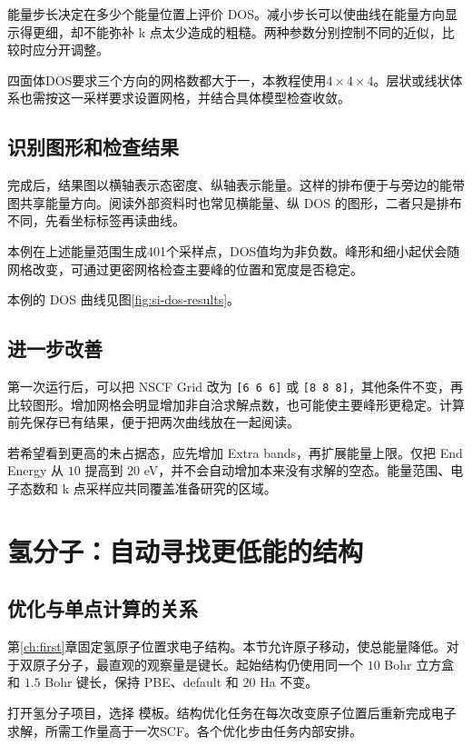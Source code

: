 能量步长决定在多少个能量位置上评价 DOS。减小步长可以使曲线在能量方向显示得更细，却不能弥补 k 点太少造成的粗糙。两种参数分别控制不同的近似，比较时应分开调整。

四面体DOS要求三个方向的网格数都大于一，本教程使用$4\times4\times4$。层状或线状体系也需按这一采样要求设置网格，并结合具体模型检查收敛。


\subsection{识别图形和检查结果}

完成后，结果图以横轴表示态密度、纵轴表示能量。这样的排布便于与旁边的能带图共享能量方向。阅读外部资料时也常见横能量、纵 DOS 的图形，二者只是排布不同，先看坐标标签再读曲线。

本例在上述能量范围生成401个采样点，DOS值均为非负数。峰形和细小起伏会随网格改变，可通过更密网格检查主要峰的位置和宽度是否稳定。

本例的 DOS 曲线见图\ref{fig:si-dos-results}。

\subsection{进一步改善 }

第一次运行后，可以把 NSCF Grid 改为 \texttt{[6 6 6]} 或 \texttt{[8 8 8]}，其他条件不变，再比较图形。增加网格会明显增加非自洽求解点数，也可能使主要峰形更稳定。计算前先保存已有结果，便于把两次曲线放在一起阅读。

若希望看到更高的未占据态，应先增加 Extra bands，再扩展能量上限。仅把 End Energy 从 $10$ 提高到 $20$ eV，并不会自动增加本来没有求解的空态。能量范围、电子态数和 k 点采样应共同覆盖准备研究的区域。

\section{氢分子：自动寻找更低能的结构}

\subsection{优化与单点计算的关系}

第\ref{ch:first}章固定氢原子位置求电子结构。本节允许原子移动，使总能量降低。对于双原子分子，最直观的观察量是键长。起始结构仍使用同一个 $10$ Bohr 立方盒和 $1.5$ Bohr 键长，保持 PBE、default 和 $20$ Ha 不变。

打开氢分子项目，选择  模板。结构优化任务在每次改变原子位置后重新完成电子求解，所需工作量高于一次SCF。各个优化步由任务内部安排。

